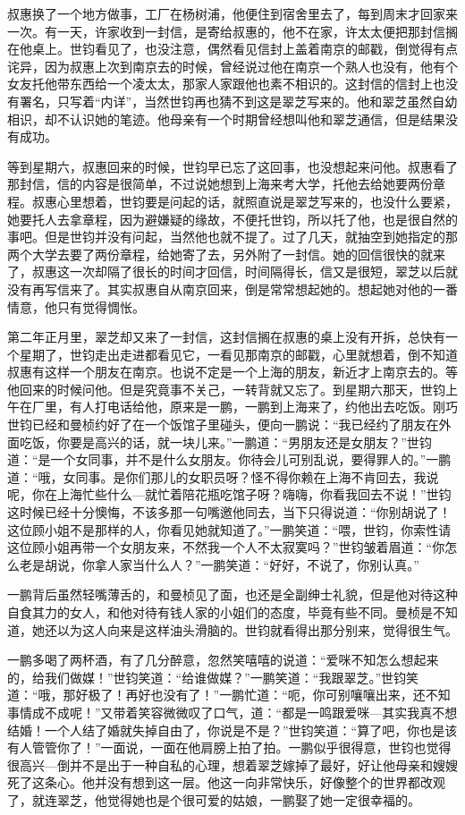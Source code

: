 \par 叔惠换了一个地方做事，工厂在杨树浦，他便住到宿舍里去了，每到周末才回家来一次。有一天，许家收到一封信，是寄给叔惠的，他不在家，许太太便把那封信搁在他桌上。世钧看见了，也没注意，偶然看见信封上盖着南京的邮戳，倒觉得有点诧异，因为叔惠上次到南京去的时候，曾经说过他在南京一个熟人也没有，他有个女友托他带东西给一个凌太太，那家人家跟他也素不相识的。这封信的信封上也没有署名，只写着“内详”，当然世钧再也猜不到这是翠芝写来的。他和翠芝虽然自幼相识，却不认识她的笔迹。他母亲有一个时期曾经想叫他和翠芝通信，但是结果没有成功。
\par 等到星期六，叔惠回来的时候，世钧早已忘了这回事，也没想起来问他。叔惠看了那封信，信的内容是很简单，不过说她想到上海来考大学，托他去给她要两份章程。叔惠心里想着，世钧要是问起的话，就照直说是翠芝写来的，也没什么要紧，她要托人去拿章程，因为避嫌疑的缘故，不便托世钧，所以托了他，也是很自然的事吧。但是世钧并没有问起，当然他也就不提了。过了几天，就抽空到她指定的那两个大学去要了两份章程，给她寄了去，另外附了一封信。她的回信很快的就来了，叔惠这一次却隔了很长的时间才回信，时间隔得长，信又是很短，翠芝以后就没有再写信来了。其实叔惠自从南京回来，倒是常常想起她的。想起她对他的一番情意，他只有觉得惆怅。
\par 第二年正月里，翠芝却又来了一封信，这封信搁在叔惠的桌上没有开拆，总快有一个星期了，世钧走出走进都看见它，一看见那南京的邮戳，心里就想着，倒不知道叔惠有这样一个朋友在南京。也说不定是一个上海的朋友，新近才上南京去的。等他回来的时候问他。但是究竟事不关己，一转背就又忘了。到星期六那天，世钧上午在厂里，有人打电话给他，原来是一鹏，一鹏到上海来了，约他出去吃饭。刚巧世钧已经和曼桢约好了在一个饭馆子里碰头，便向一鹏说：“我已经约了朋友在外面吃饭，你要是高兴的话，就一块儿来。”一鹏道：“男朋友还是女朋友？”世钧道：“是一个女同事，并不是什么女朋友。你待会儿可别乱说，要得罪人的。”一鹏道：“哦，女同事。是你们那儿的女职员呀？怪不得你赖在上海不肯回去，我说呢，你在上海忙些什么—就忙着陪花瓶吃馆子呀？嗨嗨，你看我回去不说！”世钧这时候已经十分懊悔，不该多那一句嘴邀他同去，当下只得说道：“你别胡说了！这位顾小姐不是那样的人，你看见她就知道了。”一鹏笑道：“喂，世钧，你索性请这位顾小姐再带一个女朋友来，不然我一个人不太寂寞吗？”世钧皱着眉道：“你怎么老是胡说，你拿人家当什么人？”一鹏笑道：“好好，不说了，你别认真。”
\par 一鹏背后虽然轻嘴薄舌的，和曼桢见了面，也还是全副绅士礼貌，但是他对待这种自食其力的女人，和他对待有钱人家的小姐们的态度，毕竟有些不同。曼桢是不知道，她还以为这人向来是这样油头滑脑的。世钧就看得出那分别来，觉得很生气。
\par 一鹏多喝了两杯酒，有了几分醉意，忽然笑嘻嘻的说道：“爱咪不知怎么想起来的，给我们做媒！”世钧笑道：“给谁做媒？”一鹏笑道：“我跟翠芝。”世钧笑道：“哦，那好极了！再好也没有了！”一鹏忙道：“呃，你可别嚷嚷出来，还不知事情成不成呢！”又带着笑容微微叹了口气，道：“都是一鸣跟爱咪—其实我真不想结婚！一个人结了婚就失掉自由了，你说是不是？”世钧笑道：“算了吧，你也是该有人管管你了！”一面说，一面在他肩膀上拍了拍。一鹏似乎很得意，世钧也觉得很高兴—倒并不是出于一种自私的心理，想着翠芝嫁掉了最好，好让他母亲和嫂嫂死了这条心。他并没有想到这一层。他这一向非常快乐，好像整个的世界都改观了，就连翠芝，他觉得她也是个很可爱的姑娘，一鹏娶了她一定很幸福的。
